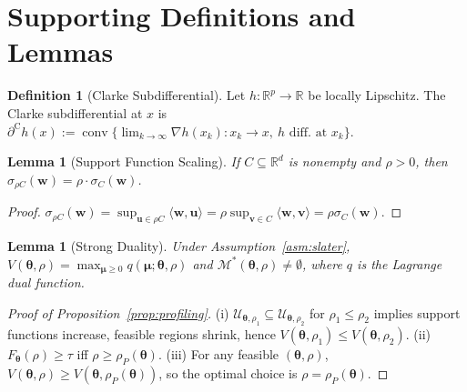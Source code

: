 \documentclass[11pt]{article}
\newcommand{\R}{\mathbb{R}}
\newcommand{\cU}{\mathcal{U}}
\newcommand{\cM}{\mathcal{M}}
\newcommand{\ip}[2]{\langle #1, #2 \rangle}
\newcommand{\btheta}{\bm{\theta}}
\newcommand{\bmu}{\bm{\mu}}
\newcommand{\bu}{\bm{u}}
\newcommand{\bw}{\bm{w}}
\DeclareMathOperator{\conv}{conv}
\newcommand{\clsubd}{\partial^{\mathrm{C}}}
\newtheorem{lemma}[theorem]{Lemma}
\theoremstyle{definition}
\newtheorem{definition}{Definition}
\begin{document}



\newpage
\appendix

\section{Supporting Definitions and Lemmas}
\label{app:supporting}

\begin{definition}[Clarke Subdifferential]\label{def:clarke}
Let $h:\R^p\to\R$ be locally Lipschitz. The Clarke subdifferential at $x$ is
$\clsubd h(x) := \conv\{\lim_{k\to\infty}\nabla h(x_k) : x_k\to x,\ h \text{ diff.\ at }x_k\}$.
\end{definition}

\begin{lemma}[Support Function Scaling]\label{lem:support-scaling}
If $C \subseteq \R^d$ is nonempty and $\rho > 0$, then $\sigma_{\rho C}(\bw) = \rho \cdot \sigma_C(\bw)$.
\end{lemma}

\begin{proof}
$\sigma_{\rho C}(\bw) = \sup_{\bu \in \rho C} \ip{\bw}{\bu} = \rho \sup_{\bm{v} \in C} \ip{\bw}{\bm{v}} = \rho \sigma_C(\bw)$.
\end{proof}

\begin{lemma}[Strong Duality]\label{lem:strong-duality}
Under Assumption~\ref{asm:slater}, $V(\btheta,\rho)=\max_{\bmu\ge 0} q(\bmu;\btheta,\rho)$ and $\cM^*(\btheta,\rho)\neq\emptyset$, where $q$ is the Lagrange dual function.
\end{lemma}

\begin{proof}[Proof of Proposition~\ref{prop:profiling}]
(i) $\cU_{\btheta,\rho_1} \subseteq \cU_{\btheta,\rho_2}$ for $\rho_1 \leq \rho_2$ implies support functions increase, feasible regions shrink, hence $V(\btheta,\rho_1) \leq V(\btheta,\rho_2)$.
(ii) $F_{\btheta}(\rho) \geq \tau$ iff $\rho \geq \rho_P(\btheta)$.
(iii) For any feasible $(\btheta,\rho)$, $V(\btheta,\rho) \geq V(\btheta,\rho_P(\btheta))$, so the optimal choice is $\rho = \rho_P(\btheta)$.
\end{proof}
\end{document}
